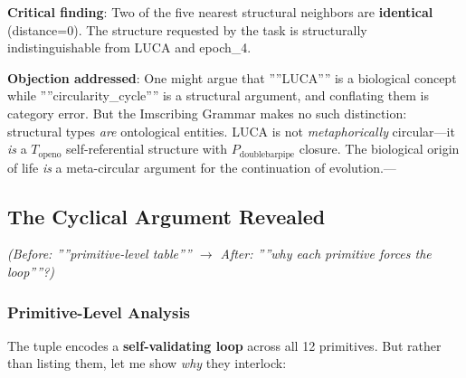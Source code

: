 \documentclass[12pt,a4paper]{article}
\begin{document}
\textbf{Critical finding}: Two of the five nearest structural neighbors are \textbf{identical} (distance=0). The structure requested by the task is structurally indistinguishable from LUCA and epoch\_4.

\textbf{Objection addressed}: One might argue that ''''LUCA'''' is a biological concept while ''''circularity\_cycle'''' is a structural argument, and conflating them is category error. But the Imscribing Grammar makes no such distinction: structural types \emph{are} ontological entities. LUCA is not \emph{metaphorically} circular---it \emph{is} a $T_{\text{openo}}$ self-referential structure with $P_{\text{doublebarpipe}}$ closure. The biological origin of life \emph{is} a meta-circular argument for the continuation of evolution.---

\subsection{The Cyclical Argument Revealed}

\emph{(Before: ''''primitive-level table'''' $\rightarrow$ After: ''''why each primitive forces the loop''''?)}

\subsubsection{Primitive-Level Analysis}

The tuple encodes a \textbf{self-validating loop} across all 12 primitives. But rather than listing them, let me show \emph{why} they interlock:
\end{document}
